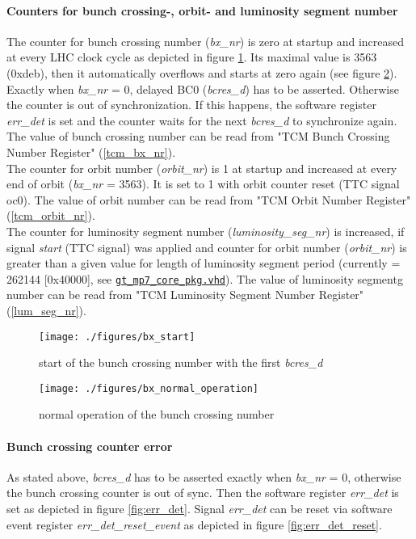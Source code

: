 \paragraph{Counters for bunch crossing-, orbit- and luminosity segment number}
The counter for bunch crossing number (\textit{bx\_nr}) is zero at startup and increased at every LHC clock cycle as depicted in figure \ref{fig:bx_start}. Its maximal value is 3563 (0xdeb), then it automatically overflows and starts at zero again (see figure \ref{fig:bx_normal_operation}). Exactly when \textit{bx\_nr} = 0, delayed BC0 (\textit{bcres\_d}) has to be asserted. Otherwise the counter is out of synchronization. If this happens, the software register \textit{err\_det} is set and the counter waits for the next \textit{bcres\_d} to synchronize again. The value of bunch crossing number can be read from "TCM Bunch Crossing Number Register" (\ref{tcm_bx_nr}).\\
The counter for orbit number (\textit{orbit\_nr}) is 1 at startup and increased at every end of orbit (\textit{bx\_nr} = 3563). It is set to 1 with orbit counter reset (TTC signal oc0). The value of orbit number can be read from "TCM Orbit Number Register" (\ref{tcm_orbit_nr}).\\
The counter for luminosity segment number (\textit{luminosity\_seg\_nr}) is increased, if signal \textit{start} (TTC signal) was applied and counter for orbit number (\textit{orbit\_nr}) is greater than a given value for length of luminosity segment period (currently = 262144 [0x40000], see \href{\gitbranch/firmware/hdl/packages/gt_mp7_core_pkg.vhd}{\texttt{\textquotesingle gt\_mp7\_core\_pkg.vhd\textquotesingle }}). The value of luminosity segmentg number can be read from "TCM Luminosity Segment Number Register" (\ref{lum_seg_nr}).

\begin{figure}[ht]
  \texttt{[image: ./figures/bx\_start]}
  \caption{start of the bunch crossing number with the first \textit{bcres\_d}}
  \label{fig:bx_start}
\end{figure}

\begin{figure}[ht]
  \texttt{[image: ./figures/bx\_normal\_operation]}
  \caption{normal operation of the bunch crossing number}
  \label{fig:bx_normal_operation}
\end{figure}

\paragraph{Bunch crossing counter error}\label{subsec:framework:tcmerrors}
As stated above, \textit{bcres\_d} has to be asserted exactly when \textit{bx\_nr} = 0, otherwise the bunch crossing counter is out of sync. Then the software register \textit{err\_det} is set as depicted in figure \ref{fig:err_det}. Signal \textit{err\_det} can be reset via software event register \textit{err\_det\_reset\_event} as depicted in figure \ref{fig:err_det_reset}.

